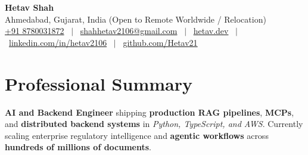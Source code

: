 \documentclass[letterpaper,10pt]{article}
\begin{document}
	\begin{center}
		{\Huge \textbf{Hetav Shah}} \\[3pt]
		\small
		Ahmedabad, Gujarat, India (Open to Remote Worldwide / Relocation) \\[2pt]
		\href{tel:+918780031872}{+91 8780031872} \ $|$ \ 
		\href{mailto:shahhetav2106@gmail.com}{shahhetav2106@gmail.com} \ $|$ \ 
		\href{https://www.hetav.dev/}{hetav.dev} \ $|$ \ 
		\href{https://www.linkedin.com/in/hetav2106/}{linkedin.com/in/hetav2106} \ $|$ \ 
		\href{https://github.com/Hetav21}{github.com/Hetav21}
	\end{center}
	\vspace{-7pt}

	\section{Professional Summary}
	\vspace{2pt}
	\small{
		\textbf{AI and Backend Engineer} shipping \textbf{production RAG pipelines}, \textbf{MCPs}, and \textbf{distributed backend systems} in \textit{Python, TypeScript, and AWS}. Currently scaling enterprise regulatory intelligence and \textbf{agentic workflows} across \textbf{hundreds of millions of documents}.
	}
	\vspace{2pt}

\end{document}

